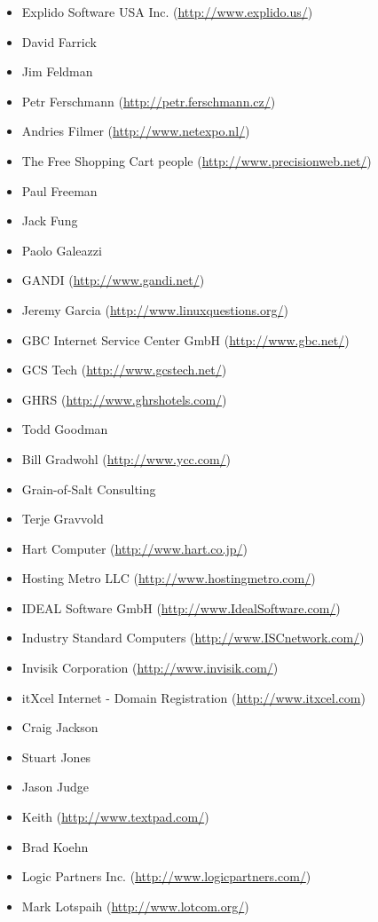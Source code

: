 \documentclass[a4paper,titlepage,12pt]{article}
\begin{document}
\begin{itemize}
	\item Explido Software USA Inc. (\url{http://www.explido.us/})
	\item David Farrick
	\item Jim Feldman
	\item Petr Ferschmann (\url{http://petr.ferschmann.cz/})
	\item Andries Filmer (\url{http://www.netexpo.nl/})
	\item The Free Shopping Cart people (\url{http://www.precisionweb.net/})
	\item Paul Freeman
	\item Jack Fung
	\item Paolo Galeazzi
	\item GANDI (\url{http://www.gandi.net/})
	\item Jeremy Garcia (\url{http://www.linuxquestions.org/})
	\item GBC Internet Service Center GmbH (\url{http://www.gbc.net/})
	\item GCS Tech (\url{http://www.gcstech.net/})
	\item GHRS (\url{http://www.ghrshotels.com/})
	\item Todd Goodman
	\item Bill Gradwohl (\url{http://www.ycc.com/})
	\item Grain-of-Salt Consulting
	\item Terje Gravvold
	\item Hart Computer (\url{http://www.hart.co.jp/})
	\item Hosting Metro LLC (\url{http://www.hostingmetro.com/})
	\item IDEAL Software GmbH (\url{http://www.IdealSoftware.com/})
	\item Industry Standard Computers (\url{http://www.ISCnetwork.com/})
	\item Invisik Corporation (\url{http://www.invisik.com/})
	\item itXcel Internet - Domain Registration (\url{http://www.itxcel.com})
	\item Craig Jackson
	\item Stuart Jones
	\item Jason Judge
	\item Keith (\url{http://www.textpad.com/})
	\item Brad Koehn
	\item Logic Partners Inc. (\url{http://www.logicpartners.com/})
	\item Mark Lotspaih (\url{http://www.lotcom.org/})

\end{itemize}
\end{document}

